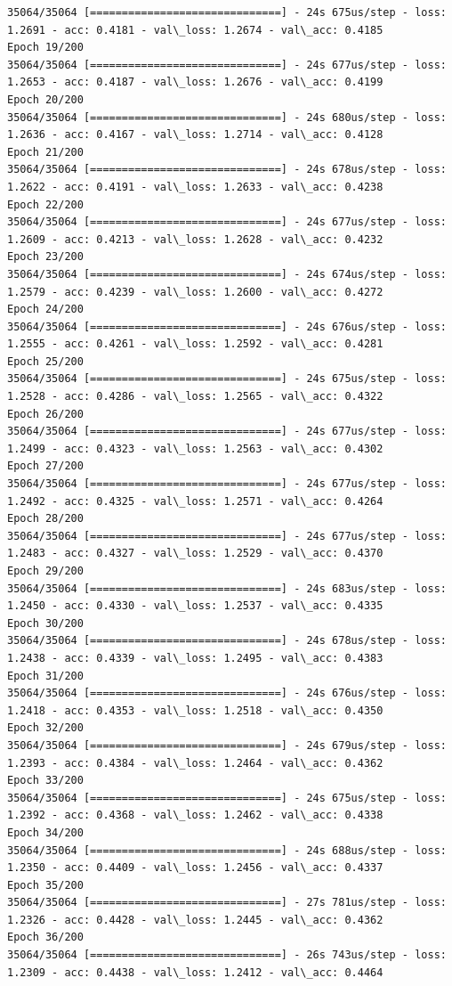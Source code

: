 \documentclass[11pt]{article}
\begin{document}
\begin{Verbatim}[commandchars=\\\{\}]
35064/35064 [==============================] - 24s 675us/step - loss: 1.2691 - acc: 0.4181 - val\_loss: 1.2674 - val\_acc: 0.4185
Epoch 19/200
35064/35064 [==============================] - 24s 677us/step - loss: 1.2653 - acc: 0.4187 - val\_loss: 1.2676 - val\_acc: 0.4199
Epoch 20/200
35064/35064 [==============================] - 24s 680us/step - loss: 1.2636 - acc: 0.4167 - val\_loss: 1.2714 - val\_acc: 0.4128
Epoch 21/200
35064/35064 [==============================] - 24s 678us/step - loss: 1.2622 - acc: 0.4191 - val\_loss: 1.2633 - val\_acc: 0.4238
Epoch 22/200
35064/35064 [==============================] - 24s 677us/step - loss: 1.2609 - acc: 0.4213 - val\_loss: 1.2628 - val\_acc: 0.4232
Epoch 23/200
35064/35064 [==============================] - 24s 674us/step - loss: 1.2579 - acc: 0.4239 - val\_loss: 1.2600 - val\_acc: 0.4272
Epoch 24/200
35064/35064 [==============================] - 24s 676us/step - loss: 1.2555 - acc: 0.4261 - val\_loss: 1.2592 - val\_acc: 0.4281
Epoch 25/200
35064/35064 [==============================] - 24s 675us/step - loss: 1.2528 - acc: 0.4286 - val\_loss: 1.2565 - val\_acc: 0.4322
Epoch 26/200
35064/35064 [==============================] - 24s 677us/step - loss: 1.2499 - acc: 0.4323 - val\_loss: 1.2563 - val\_acc: 0.4302
Epoch 27/200
35064/35064 [==============================] - 24s 677us/step - loss: 1.2492 - acc: 0.4325 - val\_loss: 1.2571 - val\_acc: 0.4264
Epoch 28/200
35064/35064 [==============================] - 24s 677us/step - loss: 1.2483 - acc: 0.4327 - val\_loss: 1.2529 - val\_acc: 0.4370
Epoch 29/200
35064/35064 [==============================] - 24s 683us/step - loss: 1.2450 - acc: 0.4330 - val\_loss: 1.2537 - val\_acc: 0.4335
Epoch 30/200
35064/35064 [==============================] - 24s 678us/step - loss: 1.2438 - acc: 0.4339 - val\_loss: 1.2495 - val\_acc: 0.4383
Epoch 31/200
35064/35064 [==============================] - 24s 676us/step - loss: 1.2418 - acc: 0.4353 - val\_loss: 1.2518 - val\_acc: 0.4350
Epoch 32/200
35064/35064 [==============================] - 24s 679us/step - loss: 1.2393 - acc: 0.4384 - val\_loss: 1.2464 - val\_acc: 0.4362
Epoch 33/200
35064/35064 [==============================] - 24s 675us/step - loss: 1.2392 - acc: 0.4368 - val\_loss: 1.2462 - val\_acc: 0.4338
Epoch 34/200
35064/35064 [==============================] - 24s 688us/step - loss: 1.2350 - acc: 0.4409 - val\_loss: 1.2456 - val\_acc: 0.4337
Epoch 35/200
35064/35064 [==============================] - 27s 781us/step - loss: 1.2326 - acc: 0.4428 - val\_loss: 1.2445 - val\_acc: 0.4362
Epoch 36/200
35064/35064 [==============================] - 26s 743us/step - loss: 1.2309 - acc: 0.4438 - val\_loss: 1.2412 - val\_acc: 0.4464

\end{Verbatim}
\end{document}

